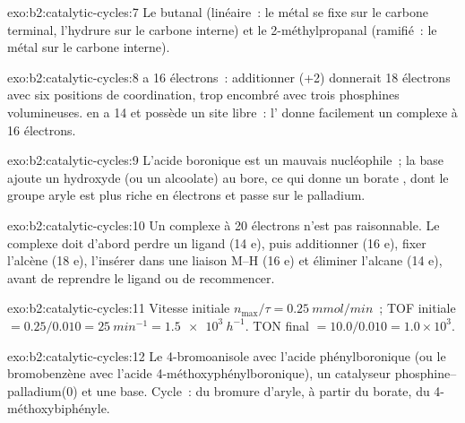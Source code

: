 \begin{solution}{exo:b2:catalytic-cycles:7}
Le butanal  (linéaire~: le métal se fixe sur le carbone terminal, l'hydrure sur
le carbone interne) et le 2-méthylpropanal  (ramifié~: le métal sur le carbone
interne).
\end{solution}

\begin{solution}{exo:b2:catalytic-cycles:8}
 a 16 électrons~: additionner  (+2) donnerait 18 électrons avec six
positions de coordination, trop encombré avec trois phosphines volumineuses.  en a 14
et possède un site libre~: l' donne facilement un complexe à 16 électrons.
\end{solution}

\begin{solution}{exo:b2:catalytic-cycles:9}
L'acide boronique est un mauvais nucléophile~; la base ajoute un hydroxyde (ou un alcoolate) au bore,
ce qui donne un borate , dont le groupe aryle est plus riche en électrons et passe sur le
palladium.
\end{solution}

\begin{solution}{exo:b2:catalytic-cycles:10}
Un complexe à 20 électrons n'est pas raisonnable. Le complexe doit d'abord perdre un ligand (14 e), puis
additionner  (16 e), fixer l'alcène (18 e), l'insérer dans une liaison M--H (16 e) et éliminer
l'alcane (14 e), avant de reprendre le ligand ou de recommencer.
\end{solution}

\begin{solution}{exo:b2:catalytic-cycles:11}
Vitesse initiale $n_{\max}/\tau = \qty{0.25}{mmol/min}$~; TOF initiale $= 0.25/0.010 =
\qty{25}{min^{-1}} = \qty{1.5e3}{h^{-1}}$. TON final $= 10.0/0.010 = 1.0 \times 10^3$.
\end{solution}

\begin{solution}{exo:b2:catalytic-cycles:12}
Le 4-bromoanisole avec l'acide phénylboronique (ou le bromobenzène avec l'acide 4-méthoxy\-phényl\-boronique),
un catalyseur phosphine--palladium(0) et une base. Cycle~:  du
bromure d'aryle,  à partir du borate,  du
4-méthoxybiphényle.
\end{solution}

